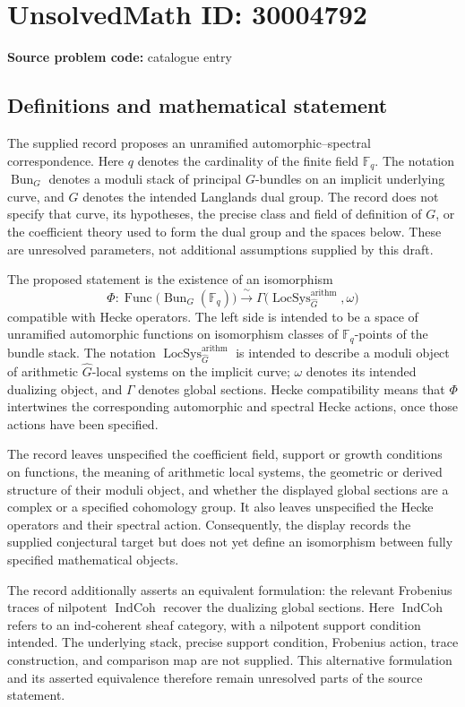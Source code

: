 \documentclass[11pt]{article}
\begin{document}
\section*{UnsolvedMath ID: 30004792}
\textbf{Source problem code:} catalogue entry
\subsection{Definitions and mathematical statement}
The supplied record proposes an unramified automorphic--spectral correspondence. Here \(q\) denotes the cardinality of the finite field \(\mathbb F_q\). The notation \(\operatorname{Bun}_G\) denotes a moduli stack of principal \(G\)-bundles on an implicit underlying curve, and \(\widehat G\) denotes the intended Langlands dual group. The record does not specify that curve, its hypotheses, the precise class and field of definition of \(G\), or the coefficient theory used to form the dual group and the spaces below. These are unresolved parameters, not additional assumptions supplied by this draft.

The proposed statement is the existence of an isomorphism
\[
\Phi:\operatorname{Func}\bigl(\operatorname{Bun}_G(\mathbb F_q)\bigr)
\xrightarrow{\ \sim\ }
\Gamma\bigl(\operatorname{LocSys}^{\operatorname{arithm}}_{\widehat G},\omega\bigr)
\]
compatible with Hecke operators. The left side is intended to be a space of unramified automorphic functions on isomorphism classes of \(\mathbb F_q\)-points of the bundle stack. The notation \(\operatorname{LocSys}^{\operatorname{arithm}}_{\widehat G}\) is intended to describe a moduli object of arithmetic \(\widehat G\)-local systems on the implicit curve; \(\omega\) denotes its intended dualizing object, and \(\Gamma\) denotes global sections. Hecke compatibility means that \(\Phi\) intertwines the corresponding automorphic and spectral Hecke actions, once those actions have been specified.

The record leaves unspecified the coefficient field, support or growth conditions on functions, the meaning of arithmetic local systems, the geometric or derived structure of their moduli object, and whether the displayed global sections are a complex or a specified cohomology group. It also leaves unspecified the Hecke operators and their spectral action. Consequently, the display records the supplied conjectural target but does not yet define an isomorphism between fully specified mathematical objects.

The record additionally asserts an equivalent formulation: the relevant Frobenius traces of nilpotent \(\operatorname{IndCoh}\) recover the dualizing global sections. Here \(\operatorname{IndCoh}\) refers to an ind-coherent sheaf category, with a nilpotent support condition intended. The underlying stack, precise support condition, Frobenius action, trace construction, and comparison map are not supplied. This alternative formulation and its asserted equivalence therefore remain unresolved parts of the source statement.
\end{document}
